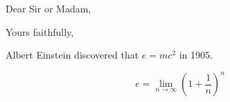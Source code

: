 \documentclass[11pt,letterpaper,sans]{moderncv}
\begin{document}

\clearpage
\date{January 01, 1984}
\opening{Dear Sir or Madam,}
\closing{Yours faithfully,}
\makelettertitle

Albert Einstein discovered that $e=mc^2$ in 1905.

\[ e=\lim_{n \to \infty} \left(1+\frac{1}{n}\right)^n \]

\makeletterclosing

\end{document}
